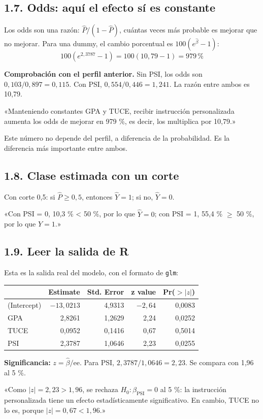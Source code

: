 \documentclass[11pt,letterpaper]{article}
\newcommand{\tema}[1]{\subsection*{#1}}
\newcommand{\Ph}{\hat{P}}
\begin{document}
\tema{1.7. Odds: aquí el efecto sí es constante}

Los odds son una razón: $\Ph/(1-\Ph)$, cuántas veces más probable es mejorar que no mejorar. Para una dummy, el cambio porcentual es $100(e^{\hat\beta}-1)$:
\[
100(e^{2{,}3787}-1)=100(10{,}79-1)=979\,\%
\]

\textbf{Comprobación con el perfil anterior.} Sin PSI, los odds son $0{,}103/0{,}897=0{,}115$. Con PSI, $0{,}554/0{,}446=1{,}241$. La razón entre ambos es 10,79.

\begin{frase}
«Manteniendo constantes GPA y TUCE, recibir instrucción personalizada aumenta los odds de mejorar en 979 \%, es decir, los multiplica por 10,79.»
\end{frase}

Este número no depende del perfil, a diferencia de la probabilidad. Es la diferencia más importante entre ambos.

\tema{1.8. Clase estimada con un corte}

Con corte 0,5: si $\Ph\ge0{,}5$, entonces $\hat Y=1$; si no, $\hat Y=0$.

\begin{frase}
«Con PSI = 0, 10,3 \% < 50 \%, por lo que $\hat Y=0$; con PSI = 1, 55,4 \% $\ge$ 50 \%, por lo que $\hat Y=1$.»
\end{frase}

\tema{1.9. Leer la salida de R}

Esta es la salida real del modelo, con el formato de \texttt{glm}:

\begin{center}
\begin{tabular}{lrrrr}
\toprule
& \textbf{Estimate} & \textbf{Std. Error} & \textbf{z value} & \textbf{Pr($>|z|$)} \\
\midrule
(Intercept) & $-13{,}0213$ & 4,9313 & $-2{,}64$ & 0,0083 \\
GPA & 2,8261 & 1,2629 & 2,24 & 0,0252 \\
TUCE & 0,0952 & 0,1416 & 0,67 & 0,5014 \\
PSI & 2,3787 & 1,0646 & 2,23 & 0,0255 \\
\bottomrule
\end{tabular}
\end{center}

\textbf{Significancia:} $z=\hat\beta/\text{ee}$. Para PSI, $2{,}3787/1{,}0646=2{,}23$. Se compara con 1,96 al 5 \%.

\begin{frase}
«Como $|z|=2{,}23>1{,}96$, se rechaza $H_0:\beta_{\text{PSI}}=0$ al 5 \%: la instrucción personalizada tiene un efecto estadísticamente significativo. En cambio, TUCE no lo es, porque $|z|=0{,}67<1{,}96$.»
\end{frase}
\end{document}
